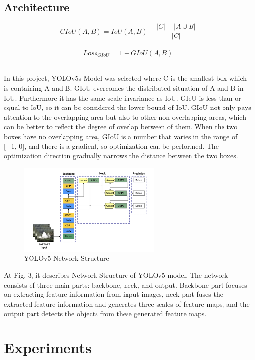 \documentclass{article}
\begin{document}
\subsection{Architecture}
\begin{equation}\label{eq1}
GIoU(A,B) = IoU(A,B) - \frac{|C|-|A\cup B|}{|C|} 
\end{equation}
\\
\begin{equation}\label{eq2}
    {Loss_{GIoU}}^{} = 1 - GIoU(A,B) 
\end{equation}\\
{In this project, YOLOv5s Model was selected where C is the smallest box which is containing A and B. GIoU overcomes the distributed situation of A and B in IoU. Furthermore it has the same scale-invariance as IoU.
GIoU is less than or equal to IoU, so it can be considered the lower bound of IoU. GIoU not only pays attention to the overlapping area but also to other non-overlapping areas, which can be better to reflect the degree of overlap between of them. When the two boxes have no overlapping area, GIoU is a number that varies in the range of [−1, 0], and there is a gradient, so optimization can be performed. The optimization direction gradually narrows the distance between the two boxes.\cite{wangyolo}

\begin{figure}[!htb]
    \centering
    \includegraphics[width=7cm]{Final_Project/image/yolov5 network structure.png}
    \caption{YOLOv5 Network Structure}
    \label{fig:my_label}
\end{figure}
{At Fig. 3, it describes Network Structure of YOLOv5 model. The network consists of three main parts: backbone, neck, and output. Backbone part focuses on extracting feature information from input images, neck part fuses the extracted feature information and generates three scales of feature maps, and the output part detects the objects from these generated feature maps.\cite{yolo}}
\section{Experiments}
}
\end{document}
